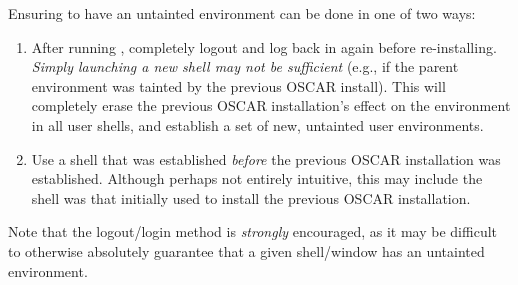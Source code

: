 Ensuring to have an untainted environment can be done in one of two
ways:

\begin{enumerate}
\item After running , completely logout and log back
  in again before re-installing.  {\em Simply launching a new shell
    may not be sufficient} (e.g., if the parent environment was
  tainted by the previous OSCAR install).  This will completely erase
  the previous OSCAR installation's effect on the environment in all
  user shells, and establish a set of new, untainted user
  environments.
  
\item Use a shell that was established {\em before} the previous OSCAR
  installation was established.  Although perhaps not entirely
  intuitive, this may include the shell was that initially used to
  install the previous OSCAR installation.
\end{enumerate}

Note that the logout/login method is {\em strongly} encouraged, as it
may be difficult to otherwise absolutely guarantee that a given
shell/window has an untainted environment.


